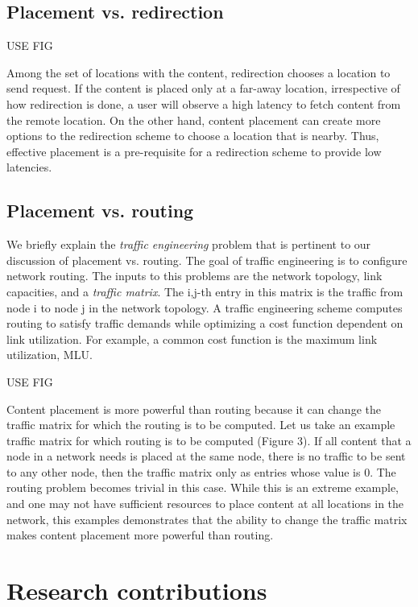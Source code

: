 \subsection{Placement vs. redirection}

USE FIG

Among the set of locations with the content, redirection chooses a location to send request. If the content is placed only at a far-away location, irrespective of how redirection is done, a user will observe a high latency to fetch content from the remote location. On the other hand, content placement can create more options to the redirection scheme to choose a location that is nearby. Thus, effective placement is a pre-requisite for a redirection scheme to provide low latencies.


\subsection{Placement vs. routing}

We briefly explain the \emph{traffic engineering} problem that is pertinent to our discussion of placement vs. routing. 
The goal of traffic engineering is to configure network routing. 
The inputs to this problems are the network topology, link capacities, and a \emph{traffic matrix}. 
The i,j-th entry in this matrix is the traffic from node i to node j in the network topology.
A traffic engineering scheme computes routing to satisfy traffic demands while optimizing a cost function dependent on link utilization. For example, a common cost function is the maximum link utilization, MLU. 

USE FIG

Content placement is more powerful than routing because it can change the traffic matrix for which the routing is to be computed. Let us take an example traffic matrix for which routing is to be computed (Figure 3). If all content that a node in a network needs is placed at the same node, there is no traffic to be sent to any other node, then the traffic matrix only as entries whose value is 0. The routing problem becomes trivial in this case. While this is an extreme example, and one may not have sufficient resources to place content at all locations in the network, this examples demonstrates that the ability to change the traffic matrix makes content placement more powerful than routing.

\section{Research contributions}

